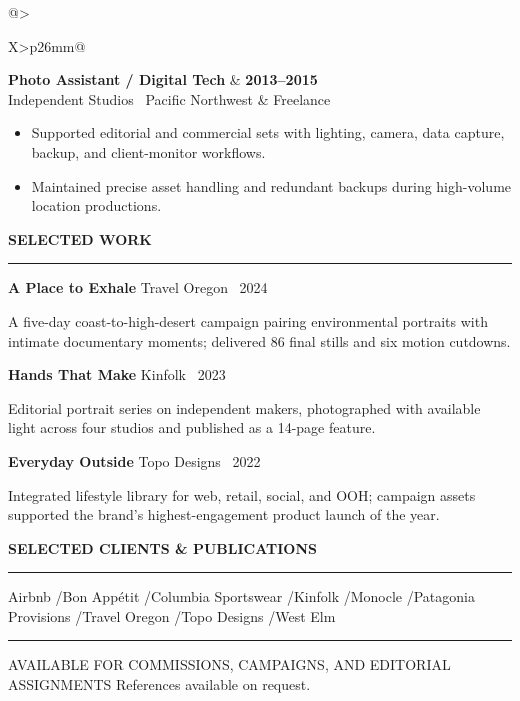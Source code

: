\documentclass[10pt,a4paper]{article}
\makeatletter
\newcommand{\mainheading}[1]{%
  \vspace{3.3mm}%
  {\fontsize{9}{11}\selectfont\bfseries\color{terracotta}\MakeUppercase{#1}}\par
  \vspace{1mm}%
  {\color{rulecolor}\rule{\linewidth}{0.45pt}}\par
  \vspace{2.2mm}%
}
\newcommand{\role}[4]{%
  \begin{tabularx}{\linewidth}{@{}>{\raggedright\arraybackslash}X>{\raggedleft\arraybackslash}p{26mm}@{}}
    {\fontsize{10.4}{12}\selectfont\bfseries\color{ink}#1} &
    {\fontsize{8.5}{10}\selectfont\bfseries\color{terracotta}#2} \\
    {\fontsize{8.8}{10.7}\selectfont\color{muted}#3} &
    {\fontsize{8.3}{10}\selectfont\color{muted}#4}
  \end{tabularx}%
  \vspace{-0.8mm}%
}
\newcommand{\project}[3]{%
  {\fontsize{9.4}{11.3}\selectfont\bfseries\color{ink}#1}\hfill
  {\fontsize{8.2}{10}\selectfont\color{terracotta}#2}\par
  \vspace{0.7mm}%
  {\fontsize{8.65}{11}\selectfont\color{muted}#3}\par
}
\makeatother
\begin{document}
\begin{minipage}[t]{122mm}
  \role{Photo Assistant / Digital Tech}{2013--2015}{Independent Studios \textbullet\ Pacific Northwest}{Freelance}
  \begin{itemize}
    \item Supported editorial and commercial sets with lighting, camera, data capture, backup, and client-monitor workflows.
    \item Maintained precise asset handling and redundant backups during high-volume location productions.
  \end{itemize}

  \mainheading{Selected Work}
  \project{A Place to Exhale}{Travel Oregon \textbullet\ 2024}{A five-day coast-to-high-desert campaign pairing environmental portraits with intimate documentary moments; delivered 86 final stills and six motion cutdowns.}
  \vspace{2.1mm}
  \project{Hands That Make}{Kinfolk \textbullet\ 2023}{Editorial portrait series on independent makers, photographed with available light across four studios and published as a 14-page feature.}
  \vspace{2.1mm}
  \project{Everyday Outside}{Topo Designs \textbullet\ 2022}{Integrated lifestyle library for web, retail, social, and OOH; campaign assets supported the brand's highest-engagement product launch of the year.}

  \mainheading{Selected Clients \& Publications}
  {\fontsize{8.8}{12.2}\selectfont\color{ink}
    Airbnb \enspace\textcolor{rulecolor}{/}\enspace Bon App\'etit
    \enspace\textcolor{rulecolor}{/}\enspace Columbia Sportswear
    \enspace\textcolor{rulecolor}{/}\enspace Kinfolk
    \enspace\textcolor{rulecolor}{/}\enspace Monocle
    \enspace\textcolor{rulecolor}{/}\enspace Patagonia Provisions
    \enspace\textcolor{rulecolor}{/}\enspace Travel Oregon
    \enspace\textcolor{rulecolor}{/}\enspace Topo Designs
    \enspace\textcolor{rulecolor}{/}\enspace West Elm
  }\par

  \vfill
  {\color{rulecolor}\rule{\linewidth}{0.45pt}}\par
  \vspace{2mm}
  {\fontsize{8.1}{10}\selectfont\color{muted}
    AVAILABLE FOR COMMISSIONS, CAMPAIGNS, AND EDITORIAL ASSIGNMENTS
    \hfill References available on request.
  }
\end{minipage}
\end{document}
